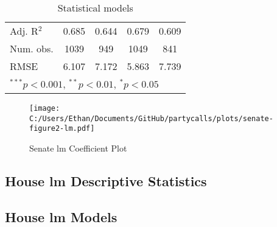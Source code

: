 \documentclass[12pt]{article}
\begin{document}
\begin{table}
\begin{center}
\begin{tabular}{l c c c c }
			Adj. R$^2$             & 0.685          & 0.644           & 0.679          & 0.609         \\
			Num. obs.              & 1039           & 949             & 1049           & 841           \\
			RMSE                   & 6.107          & 7.172           & 5.863          & 7.739         \\
			\hline
			\multicolumn{5}{l}{\scriptsize{$^{***}p<0.001$, $^{**}p<0.01$, $^*p<0.05$}}
		\end{tabular}
		\caption{Statistical models}
	\end{center}
\end{table}

\begin{figure}[h]
	\centering
	\caption{Senate lm Coefficient Plot}
	\texttt{[image: C:/Users/Ethan/Documents/GitHub/partycalls/plots/senate-figure2-lm.pdf]}
\end{figure}

\subsection{House lm Descriptive Statistics}

\subsection{House lm Models}
\end{document}
